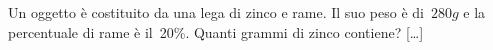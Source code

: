 \begin{multicols}{2}
% 
% 
% 

\begin{esercizio}
\label{ese:3.179}
 Un oggetto è costituito da una lega di zinco e rame. Il suo peso
è di~\(280\unit{g}\) e la percentuale di rame è il~20\%. Quanti grammi di zinco
contiene? \hfill [\dots]
\end{esercizio}

% 
% 


\end{multicols}
